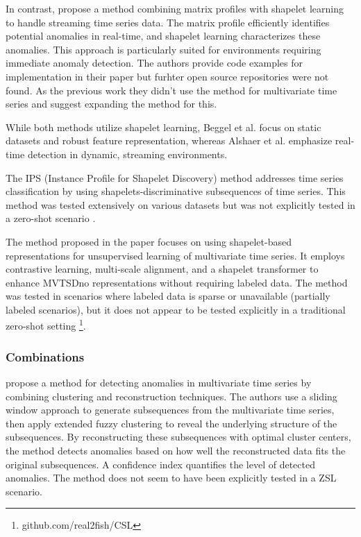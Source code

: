 In contrast, \cite{alshaer_detecting_2020} propose a method combining matrix profiles with shapelet learning to handle streaming time series data. The matrix profile efficiently identifies potential anomalies in real-time, and shapelet learning characterizes these anomalies. This approach is particularly suited for environments requiring immediate anomaly detection. The authors provide code examples for implementation in their paper but furhter open source repositories were not found. As the previous work they didn't use the method for multivariate time series and suggest expanding the method for this.

While both methods utilize shapelet learning, Beggel et al. focus on static datasets and robust feature representation, whereas Alshaer et al. emphasize real-time detection in dynamic, streaming environments.

The IPS (Instance Profile for Shapelet Discovery) method addresses time series classification by using shapelets-discriminative subsequences of time series. This method was tested extensively on various datasets but was not explicitly tested in a zero-shot scenario \cite{li_ips_2022}.

The method proposed in the paper focuses on using shapelet-based representations for unsupervised learning of multivariate time series. It employs contrastive learning, multi-scale alignment, and a shapelet transformer to enhance MVTSDno representations without requiring labeled data. The method was tested in scenarios where labeled data is sparse or unavailable (partially labeled scenarios), but it does not appear to be tested explicitly in a traditional zero-shot setting
\cite{liang_shapelet-based_2024} \footnote{\fussy\tiny github.com/real2fish/CSL}.

\subsubsection{Combinations}
\cite{li_clustering-based_2021} propose a method for detecting anomalies in multivariate time series by combining clustering and reconstruction techniques. The authors use a sliding window approach to generate subsequences from the multivariate time series, then apply extended fuzzy clustering to reveal the underlying structure of the subsequences. By reconstructing these subsequences with optimal cluster centers, the method detects anomalies based on how well the reconstructed data fits the original subsequences. A confidence index quantifies the level of detected anomalies. The method does not seem to have been explicitly tested in a ZSL scenario.


